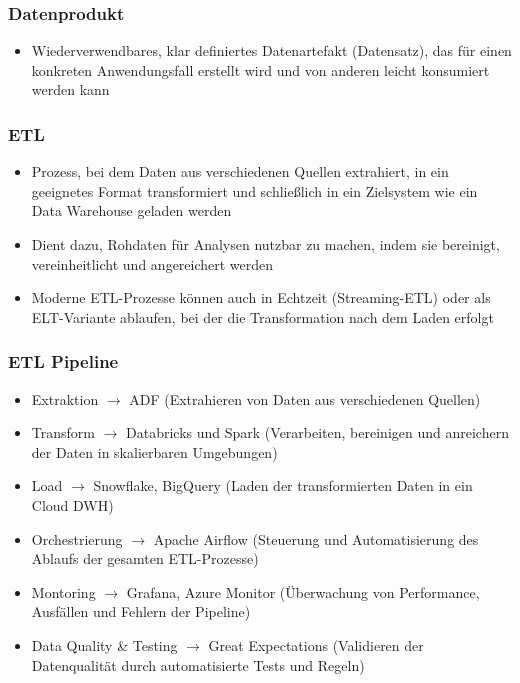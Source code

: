 \documentclass[11pt]{scrartcl}
\begin{document}
\subsubsection*{Datenprodukt}
\begin{itemize}
	\item Wiederverwendbares, klar definiertes Datenartefakt (Datensatz), das für einen konkreten Anwendungsfall erstellt wird und von anderen leicht konsumiert werden kann
\end{itemize}

\subsubsection*{ETL}
\begin{itemize}
	\item Prozess, bei dem Daten aus verschiedenen Quellen extrahiert, in ein geeignetes Format transformiert und schließlich in ein Zielsystem wie ein Data Warehouse geladen werden
	\item Dient dazu, Rohdaten für Analysen nutzbar zu machen, indem sie bereinigt, vereinheitlicht und angereichert werden
	\item Moderne ETL-Prozesse können auch in Echtzeit (Streaming-ETL) oder als ELT-Variante ablaufen, bei der die Transformation nach dem Laden erfolgt
\end{itemize}

\subsubsection*{ETL Pipeline}
\begin{itemize}
	\item Extraktion $ \to $ ADF (Extrahieren von Daten aus verschiedenen Quellen)
	\item Transform $ \to $ Databricks und Spark (Verarbeiten, bereinigen und anreichern der Daten in skalierbaren Umgebungen)
	\item Load $ \to $ Snowflake, BigQuery (Laden der transformierten Daten in ein Cloud DWH)
	\item Orchestrierung $ \to $ Apache Airflow (Steuerung und Automatisierung des Ablaufs der gesamten ETL-Prozesse)
	\item Montoring $ \to $ Grafana, Azure Monitor (Überwachung von Performance, Ausfällen und Fehlern der Pipeline)
	\item Data Quality \& Testing $ \to $ Great Expectations (Validieren der Datenqualität durch automatisierte Tests und Regeln)
\end{itemize}
\end{document}
